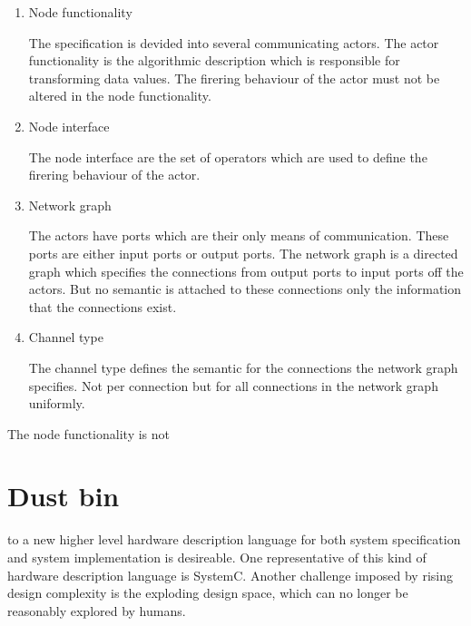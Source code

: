 \begin{enumerate}
\item Node functionality

The specification is devided into several communicating actors.
The actor functionality is the algorithmic description
which is responsible for transforming data values. The firering behaviour
of the actor must not be altered in the node functionality.

\item Node interface

The node interface are the set of operators which are used to
define the firering behaviour of the actor.

\item Network graph

The actors have ports which are their only means of communication.
These ports are either input ports or output ports.
The network graph is a directed graph which specifies the connections from
output ports to input ports off the actors.
But no semantic is attached to these connections
only the information that the connections exist.

\item
Channel type

The channel type defines the semantic for the connections
the network graph specifies. Not per connection but for all
connections in the network graph uniformly.
\end{enumerate}

The node functionality is not


\clearpage
\section*{Dust bin}


to a new higher level hardware description
language for both system specification and system implementation is
desireable. One representative of this kind of hardware description
language is SystemC. Another challenge imposed by rising design complexity
is the exploding design space, which can no longer be reasonably explored
by humans.



